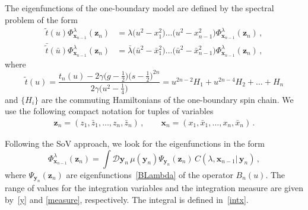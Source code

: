 \documentclass[a4paper,11pt]{article}
\numberwithin{equation}{section}
\begin{document}
The eigenfunctions of the one-boundary model are defined by the spectral problem of the form
\begin{equation*} 
	\begin{aligned}
		\tilde{t}(u)\Phi_{\bm{x}_{n-1}}^{\lambda}(\bm{z}_{n}) 
		&= \lambda \bigl(u^2-x_1^2\bigr) \ldots \bigl(u^2-x_{n-1}^2\bigr) \Phi_{\bm{x}_{n-1}}^{\lambda}(\bm{z}_{n}) \,, \\
		\bar{\tilde{t}}(\bar{u})\Phi_{\bm{x}_{n-1}}^{\lambda}(\bm{z}_{n}) 
		&= \bar{\lambda} \bigl(\bar{u}^2-\bar{x}_1^2\bigr) \ldots \bigl(\bar{u}^2-\bar{x}_{n-1}^2\bigr) \Phi_{\bm{x}_{n-1}}^{\lambda}(\bm{z}_{n}) \,,
	\end{aligned}
\end{equation*}
where
\begin{equation*} 
	\tilde{t}(u) = \frac{t_n(u) - 2\gamma\bigl(g-\frac{1}{2}\bigr)\bigl(s-\frac{1}{2}\bigr)^{2n}}{2\gamma \bigl(u^{2} - \frac{1}{4}\bigr)} = u^{2n-2}H_1+u^{2n-4}H_2+\ldots+H_n
\end{equation*}
and $\{H_i\}$ are the commuting Hamiltonians of the one-boundary spin chain.
We use the following compact notation for tuples of variables
\begin{align*}
	\bm{z}_n = (z_1,\bar{z}_1, \ldots, z_n, \bar{z}_n) \,, \qquad  
	\bm{x}_n = (x_1,\bar{x}_1, \ldots, x_n, \bar{x}_n) \,.
\end{align*}

Following the SoV approach, we look for the eigenfunctions in the form
\begin{equation*}
	\Phi_{\bm{x}_{n-1}}^{\lambda}(\bm{z}_n) = \int \mathcal{D}\bm{y}_n \, \mu(\bm{y}_n) \Psi_{\bm{y}_n}(\bm{z}_n) \, C(\lambda, \bm{x}_{n-1}|\,\bm{y}_{n}) \,,
\end{equation*} 
where $\Psi_{\bm{y}_n}(\bm{z}_n)$ are eigenfunctions~\eqref{BLambda} of the operator $B_n(u)$.
The range of values for the integration variables and the integration measure are given by~\eqref{y} and \eqref{measure}, respectively. The integral is defined in~\eqref{intx}.
\end{document}
